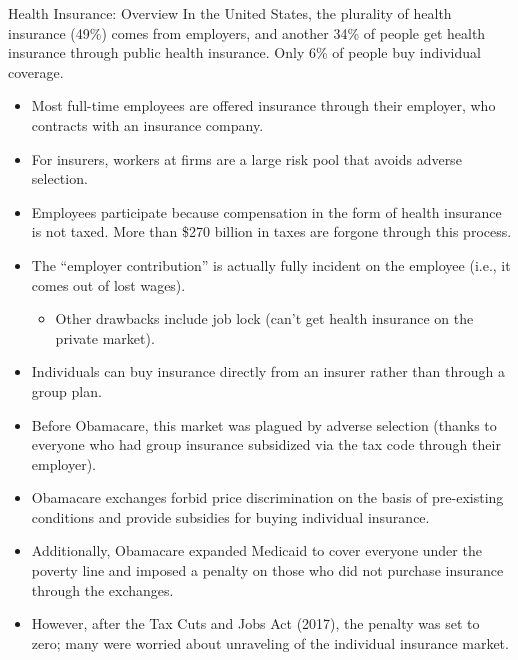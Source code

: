 \documentclass[8pt]{extarticle}
\begin{document}
\begin{problem}{Health Insurance: Overview}
    In the United States, the plurality of health insurance (49\%) comes from employers, and another 34\% of people get health insurance through public health insurance. Only 6\% of people buy individual coverage.
    \begin{itemize}
      \item Most full-time employees are offered insurance through their employer, who contracts with an insurance company.
      \item For insurers, workers at firms are a large risk pool that avoids adverse selection.
      \item Employees participate because compensation in the form of health insurance is not taxed. More than \$270 billion in taxes are forgone through this process.
      \item The ``employer contribution'' is actually fully incident on the employee (i.e., it comes out of lost wages).
        \begin{itemize}
          \item Other drawbacks include job lock (can't get health insurance on the private market).
        \end{itemize}
      \item Individuals can buy insurance directly from an insurer rather than through a group plan.
      \item Before Obamacare, this market was plagued by adverse selection (thanks to everyone who had group insurance subsidized via the tax code through their employer).
      \item Obamacare exchanges forbid price discrimination on the basis of pre-existing conditions and provide subsidies for buying individual insurance.
      \item Additionally, Obamacare expanded Medicaid to cover everyone under the poverty line and imposed a penalty on those who did not purchase insurance through the exchanges.
      \item However, after the Tax Cuts and Jobs Act (2017), the penalty was set to zero; many were worried about unraveling of the individual insurance market.
    \end{itemize}
  \end{problem}
\end{document}
